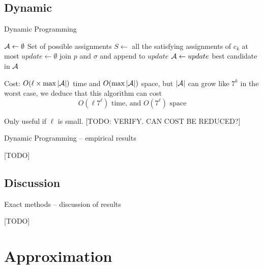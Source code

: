 \documentclass[aspectratio=169, compress, xcolor=table,xcolor=dvipsnames]{beamer}
\begin{document}
%
%
%
%

\subsection{Dynamic}

\begin{frame}
{Dynamic Programming}

\begin{algorithmic}[1]\sffamily
	\State $\cal A\gets\emptyset$
		\Comment Set of possible assignments
		\State $S\gets$ all the satisfying assignments of $c_k$
			 at most
		\State $update \gets \emptyset$
					\State join $p$ and $\sigma$ and append to $update$
				\EndIf
			\EndFor
		\EndFor
		\State ${\cal A}\gets update$
	\EndFor
	\State \Return best candidate in $\cal A$
\end{algorithmic}

\bigskip
\vfill

Cost: $O(\ell\times \max |\cal A|)$ time and $O(\max |\cal A|)$ space, but $|\cal A|$ can grow like $7^k$ in the worst case, we deduce that this algorithm can cost
\[O(\ell 7^\ell) \text{ time, and } O(7^\ell)\text{ space}\]

Only useful if $\ell$ is small.
[TODO: VERIFY. CAN COST BE REDUCED?]
\end{frame}

\begin{frame}
	{Dynamic Programming -- empirical results}

[TODO]

\end{frame}

\subsection{Discussion}

\begin{frame}
{Exact methods -- discussion of results}

[TODO]
\end{frame}

%
%
%
%

\section{Approximation}
\end{document}
